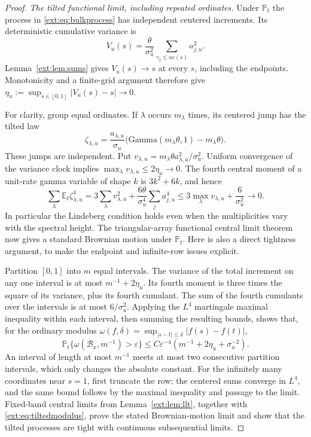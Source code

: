 \documentclass[11pt]{article}
\theoremstyle{definition}
\theoremstyle{remark}
\begin{document}
\begin{proof}
\emph{The tilted functional limit, including repeated ordinates.}
Under $\mathbb P_t$ the process in \eqref{ext:eq:bulkprocess} has independent
centered increments.  Its deterministic cumulative variance is
\[
 V_u(s)=\frac{\theta}{\sigma_u^2}
        \sum_{\gamma_j\le u c(s)}a_{j,u}^2.
\]
Lemma~\ref{ext:lem:sums} gives $V_u(s)\to s$ at every $s$, including the
endpoints.  Monotonicity and a finite-grid argument therefore give
$\eta_u:=\sup_{s\in[0,1]}|V_u(s)-s|\to0$.

For clarity, group equal ordinates.  If $\lambda$ occurs $m_\lambda$
times, its centered jump has the tilted law
\[
 \zeta_{\lambda,u}
   =\frac{a_{\lambda,u}}{\sigma_u}
       \bigl(\mathrm{Gamma}(m_\lambda\theta,1)-m_\lambda\theta\bigr).
\]
These jumps are independent.  Put
$v_{\lambda,u}=m_\lambda\theta a_{\lambda,u}^2/\sigma_u^2$.
Uniform convergence of the variance clock implies
$\max_\lambda v_{\lambda,u}\le2\eta_u\to0$.
The fourth central moment of a unit-rate gamma variable of shape $k$ is
$3k^2+6k$, and hence
\begin{equation}\label{ext:eq:groupfourth}
 \sum_\lambda\mathbb E_t\zeta_{\lambda,u}^4
  =3\sum_\lambda v_{\lambda,u}^2
    +\frac{6\theta}{\sigma_u^4}\sum_j a_{j,u}^4
  \le3\max_\lambda v_{\lambda,u}+\frac6{\sigma_u^2}
       \longrightarrow0.
\end{equation}
In particular the Lindeberg condition holds even when the multiplicities
vary with the spectral height.  The triangular-array functional central
limit theorem~\cite{Whitt2007} now gives a standard Brownian motion under $\mathbb P_t$.
Here is also a direct tightness argument, to make the endpoint and
infinite-row issues explicit.

Partition $[0,1]$ into $m$ equal intervals.  The variance of the total
increment on any one interval is at most $m^{-1}+2\eta_u$.  Its fourth
moment is three times the square of its variance, plus its fourth
cumulant.  The sum of the fourth cumulants over the intervals is at most
$6/\sigma_u^2$.  Applying the $L^4$ martingale maximal inequality within
each interval, then summing the resulting bounds, shows that, for the
ordinary modulus
$\omega(f,\delta)=\sup_{|s-t|\le\delta}|f(s)-f(t)|$,
\begin{equation}\label{ext:eq:tiltedmodulus}
 \mathbb P_t\{\omega(\mathcal B_x,m^{-1})>\varepsilon\}
  \le C\varepsilon^{-4}
           \left(m^{-1}+2\eta_u+\sigma_u^{-2}\right).
\end{equation}
An interval of length at most $m^{-1}$ meets at most two consecutive
partition intervals, which only changes the absolute constant.
For the infinitely many coordinates near $s=1$, first truncate the row;
the centered sums converge in $L^4$, and the same bound follows by
the maximal inequality and passage to the limit.  Fixed-band central
limits from Lemma~\ref{ext:lem:llt}, together with
\eqref{ext:eq:tiltedmodulus}, prove the stated Brownian-motion limit and
show that the tilted processes are tight with continuous subsequential
limits.


\end{proof}
\end{document}
